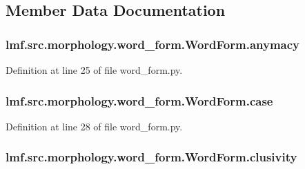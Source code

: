 \subsection{Member Data Documentation}
\hypertarget{classlmf_1_1src_1_1morphology_1_1word__form_1_1_word_form_aaf6096a08af3e92ad3878b68d2e136d3}{
\subsubsection[{anymacy}]{\setlength{\rightskip}{0pt plus 5cm}lmf.\+src.\+morphology.\+word\+\_\+form.\+Word\+Form.\+anymacy}}\label{classlmf_1_1src_1_1morphology_1_1word__form_1_1_word_form_aaf6096a08af3e92ad3878b68d2e136d3}


Definition at line 25 of file word\+\_\+form.\+py.

\hypertarget{classlmf_1_1src_1_1morphology_1_1word__form_1_1_word_form_ac996cb6a252a2e97aea0ba861982a640}{
\subsubsection[{case}]{\setlength{\rightskip}{0pt plus 5cm}lmf.\+src.\+morphology.\+word\+\_\+form.\+Word\+Form.\+case}}\label{classlmf_1_1src_1_1morphology_1_1word__form_1_1_word_form_ac996cb6a252a2e97aea0ba861982a640}


Definition at line 28 of file word\+\_\+form.\+py.

\hypertarget{classlmf_1_1src_1_1morphology_1_1word__form_1_1_word_form_aafbd3d5422083422a4a9ee9b1379913e}{
\subsubsection[{clusivity}]{\setlength{\rightskip}{0pt plus 5cm}lmf.\+src.\+morphology.\+word\+\_\+form.\+Word\+Form.\+clusivity}}\label{classlmf_1_1src_1_1morphology_1_1word__form_1_1_word_form_aafbd3d5422083422a4a9ee9b1379913e}


